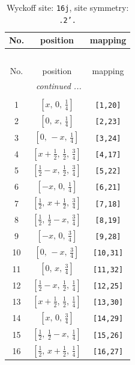 \documentclass[fleqn,8pt]{jsarticle}
\begin{document}
\renewcommand{\arraystretch}{1.2}
\begin{longtable}{ccc}
\caption{Wyckoff site: {\tt 16j}, site symmetry: {\tt .2'.}}
 \\
 \hline \hline
No. & position & mapping \\ \hline \endfirsthead

\multicolumn{2}{l}{\tablename\ \thetable{}} \\
 \hline \hline
No. & position & mapping \\ \hline \endhead

 \hline \hline
\multicolumn{2}{r}{\footnotesize\it continued ...} \\ \endfoot

 \hline \hline
\multicolumn{2}{r}{} \\ \endlastfoot

1 & $\left[ x,\, 0,\, \frac{1}{4} \right]$ & {\tt [1,20]} \\ \hline
2 & $\left[ 0,\, x,\, \frac{1}{4} \right]$ & {\tt [2,23]} \\ \hline
3 & $\left[ 0,\, - x,\, \frac{1}{4} \right]$ & {\tt [3,24]} \\ \hline
4 & $\left[ x + \frac{1}{2},\, \frac{1}{2},\, \frac{3}{4} \right]$ & {\tt [4,17]} \\ \hline
5 & $\left[ \frac{1}{2} - x,\, \frac{1}{2},\, \frac{3}{4} \right]$ & {\tt [5,22]} \\ \hline
6 & $\left[ - x,\, 0,\, \frac{1}{4} \right]$ & {\tt [6,21]} \\ \hline
7 & $\left[ \frac{1}{2},\, x + \frac{1}{2},\, \frac{3}{4} \right]$ & {\tt [7,18]} \\ \hline
8 & $\left[ \frac{1}{2},\, \frac{1}{2} - x,\, \frac{3}{4} \right]$ & {\tt [8,19]} \\ \hline
9 & $\left[ - x,\, 0,\, \frac{3}{4} \right]$ & {\tt [9,28]} \\ \hline
10 & $\left[ 0,\, - x,\, \frac{3}{4} \right]$ & {\tt [10,31]} \\ \hline
11 & $\left[ 0,\, x,\, \frac{3}{4} \right]$ & {\tt [11,32]} \\ \hline
12 & $\left[ \frac{1}{2} - x,\, \frac{1}{2},\, \frac{1}{4} \right]$ & {\tt [12,25]} \\ \hline
13 & $\left[ x + \frac{1}{2},\, \frac{1}{2},\, \frac{1}{4} \right]$ & {\tt [13,30]} \\ \hline
14 & $\left[ x,\, 0,\, \frac{3}{4} \right]$ & {\tt [14,29]} \\ \hline
15 & $\left[ \frac{1}{2},\, \frac{1}{2} - x,\, \frac{1}{4} \right]$ & {\tt [15,26]} \\ \hline
16 & $\left[ \frac{1}{2},\, x + \frac{1}{2},\, \frac{1}{4} \right]$ & {\tt [16,27]} \\
\end{longtable}
\end{document}
